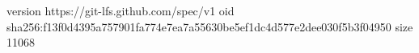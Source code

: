 version https://git-lfs.github.com/spec/v1
oid sha256:f13f0d4395a757901fa774e7ea7a55630be5ef1dc4d577e2dee030f5b3f04950
size 11068

